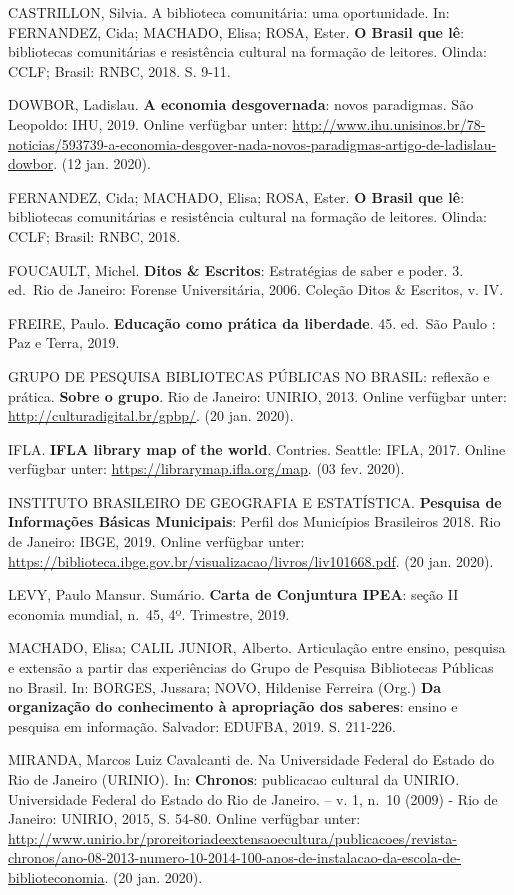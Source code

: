 \documentclass[a4paper,
fontsize=11pt,
oneside,
numbers=noperiodatend,
parskip=half-,
bibliography=totoc,
final
]{scrartcl}
\begin{document}
CASTRILLON, Silvia. A biblioteca comunitária: uma oportunidade. In:
FERNANDEZ, Cida; MACHADO, Elisa; ROSA, Ester. \textbf{O Brasil que lê}:
bibliotecas comunitárias e resistência cultural na formação de leitores.
Olinda: CCLF; Brasil: RNBC, 2018. S. 9-11.

DOWBOR, Ladislau. \textbf{A economia desgovernada}: novos paradigmas.
São Leopoldo: IHU, 2019. Online verfügbar unter:
\href{http://www.ihu.unisinos.br/78-noticias/593739-a-economia-desgovernada-novos-paradigmas-artigo-de-ladislau-dowbor}{http://www.ihu.unisinos.br/78-noticias/593739-a-economia-desgover-nada-novos-paradigmas-artigo-de-ladislau-dowbor}.
(12 jan. 2020).

FERNANDEZ, Cida; MACHADO, Elisa; ROSA, Ester. \textbf{O Brasil que lê}:
bibliotecas comunitárias e resistência cultural na formação de leitores.
Olinda: CCLF; Brasil: RNBC, 2018.

FOUCAULT, Michel. \textbf{Ditos \& Escritos}: Estratégias de saber e
poder. 3. ed.~Rio de Janeiro: Forense Universitária, 2006. Coleção Ditos
\& Escritos, v. IV.

FREIRE, Paulo. \textbf{Educação como prática da liberdade}. 45. ed.~São
Paulo : Paz e Terra, 2019.

GRUPO DE PESQUISA BIBLIOTECAS PÚBLICAS NO BRASIL: reflexão e prática.
\textbf{Sobre o grupo}. Rio de Janeiro: UNIRIO, 2013. Online verfügbar
unter: \url{http://culturadigital.br/gpbp/}. (20 jan. 2020).

IFLA. \textbf{IFLA library map of the world}. Contries. Seattle: IFLA,
2017. Online verfügbar unter: \url{https://librarymap.ifla.org/map}. (03
fev. 2020).

INSTITUTO BRASILEIRO DE GEOGRAFIA E ESTATÍSTICA. \textbf{Pesquisa de
Informações Básicas Municipais}: Perfil dos Municípios Brasileiros 2018.
Rio de Janeiro: IBGE, 2019. Online verfügbar unter:
\url{https://biblioteca.ibge.gov.br/visualizacao/livros/liv101668.pdf}.
(20 jan. 2020).

LEVY, Paulo Mansur. Sumário. \textbf{Carta de Conjuntura IPEA}: seção II
economia mundial, n.~45, 4º. Trimestre, 2019.

MACHADO, Elisa; CALIL JUNIOR, Alberto. Articulação entre ensino,
pesquisa e extensão a partir das experiências do Grupo de Pesquisa
Bibliotecas Públicas no Brasil. In: BORGES, Jussara; NOVO, Hildenise
Ferreira (Org.) \textbf{Da organização do conhecimento à apropriação dos
saberes}: ensino e pesquisa em informação. Salvador: EDUFBA, 2019. S.
211-226.

MIRANDA, Marcos Luiz Cavalcanti de. Na Universidade Federal do Estado do
Rio de Janeiro (URINIO). In: \textbf{Chronos}: publicacao cultural da
UNIRIO. Universidade Federal do Estado do Rio de Janeiro. -- v. 1, n.~10
(2009) - Rio de Janeiro: UNIRIO, 2015, S. 54-80. Online verfügbar unter:
\url{http://www.unirio.br/proreitoriadeextensaoecultura/publicacoes/revista-chronos/ano-08-2013-numero-10-2014-100-anos-de-instalacao-da-escola-de-biblioteconomia}.
(20 jan. 2020).
\end{document}
